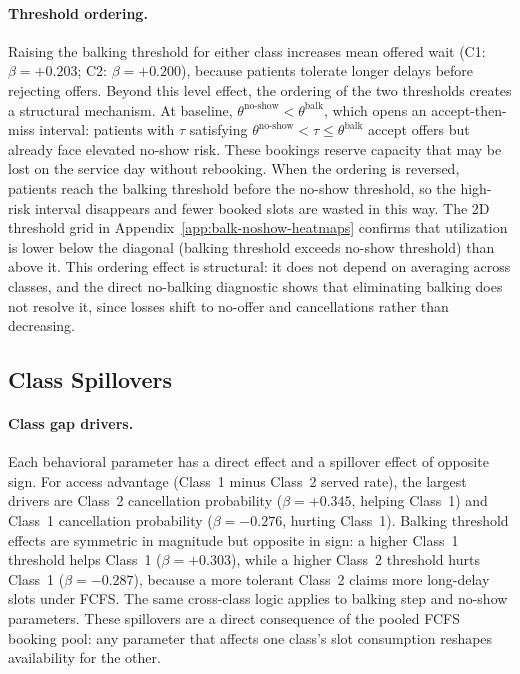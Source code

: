 \documentclass[11pt]{article}
\begin{document}
\paragraph{Threshold ordering.}
Raising the balking threshold for either class increases mean offered wait
(C1: \(\beta=+0.203\); C2: \(\beta=+0.200\)), because patients tolerate longer
delays before rejecting offers. Beyond this level effect, the ordering of the
two thresholds creates a structural mechanism. At baseline,
\(\theta^{\text{no-show}} < \theta^{\text{balk}}\), which opens an
accept-then-miss interval: patients with \(\tau\) satisfying
\(\theta^{\text{no-show}} < \tau \leq \theta^{\text{balk}}\) accept offers but
already face elevated no-show risk. These bookings reserve capacity that may be
lost on the service day without rebooking. When the ordering is reversed,
patients reach the balking threshold before the no-show threshold, so the
high-risk interval disappears and fewer booked slots are wasted in this way.
The 2D threshold grid in Appendix~\ref{app:balk-noshow-heatmaps} confirms that
utilization is lower below the diagonal (balking threshold exceeds no-show
threshold) than above it. This ordering effect is structural: it does not
depend on averaging across classes, and the direct no-balking diagnostic shows
that eliminating balking does not resolve it, since losses shift to no-offer
and cancellations rather than decreasing.

\subsection{Class Spillovers}

\paragraph{Class gap drivers.}
Each behavioral parameter has a direct effect and a spillover effect of
opposite sign. For access advantage (Class~1 minus Class~2 served rate),
the largest drivers are Class~2 cancellation probability (\(\beta=+0.345\),
helping Class~1) and Class~1 cancellation probability (\(\beta=-0.276\),
hurting Class~1). Balking threshold effects are symmetric in magnitude but
opposite in sign: a higher Class~1 threshold helps Class~1
(\(\beta=+0.303\)), while a higher Class~2 threshold hurts Class~1
(\(\beta=-0.287\)), because a more tolerant Class~2 claims more long-delay
slots under FCFS\@. The same cross-class logic applies to balking step and
no-show parameters. These spillovers are a direct consequence of the pooled
FCFS booking pool: any parameter that affects one class's slot consumption
reshapes availability for the other.
\end{document}
